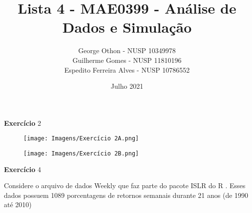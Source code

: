 \documentclass{article}
\title{Lista 4 - MAE0399 - Análise de Dados e Simulação}
\author{George Othon - NUSP 10349978 \\ Guilherme Gomes - NUSP 11810196 \\ Espedito Ferreira Alves - NUSP 10786552}
\date{Julho 2021}
\begin{document}
\maketitle

\begin{flushleft}
\textbf{Exercício} 2
\\[0.5cm]
\end{flushleft}

\begin{enumerate}
    \begin{figure}[htb]
        \centering
        \texttt{[image: Imagens/Exercício 2A.png]}
        \label{fig:my_label}
    \end{figure}
    
    \begin{figure}[htb]
        \centering
        \texttt{[image: Imagens/Exercício 2B.png]}
        \label{fig:my_label}
    \end{figure}
    
\end{enumerate}


\newpage
\begin{flushleft}
\textbf{Exercício} 4
\\[0.5cm]
\end{flushleft}
Considere o arquivo de dados Weekly que faz parte do pacote ISLR
do R . Esses dados possuem 1089 porcentagens de retornos semanais durante
21 anos (de 1990 até 2010)
\end{document}
